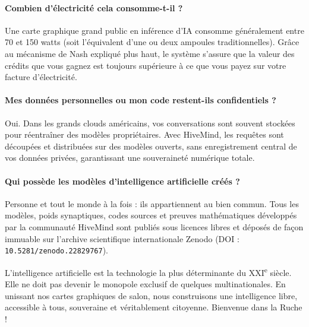 \documentclass[11pt,a4paper]{article}
\begin{document}
\paragraph{Combien d'électricité cela consomme-t-il ?}
Une carte graphique grand public en inférence d'IA consomme généralement entre 70 et 150 watts (soit l'équivalent d'une ou deux ampoules traditionnelles). Grâce au mécanisme de Nash expliqué plus haut, le système s'assure que la valeur des crédits que vous gagnez est toujours supérieure à ce que vous payez sur votre facture d'électricité.

\paragraph{Mes données personnelles ou mon code restent-ils confidentiels ?}
Oui. Dans les grands clouds américains, vos conversations sont souvent stockées pour réentraîner des modèles propriétaires. Avec HiveMind, les requêtes sont découpées et distribuées sur des modèles ouverts, sans enregistrement central de vos données privées, garantissant une souveraineté numérique totale.

\paragraph{Qui possède les modèles d'intelligence artificielle créés ?}
Personne et tout le monde à la fois : ils appartiennent au bien commun. Tous les modèles, poids synaptiques, codes sources et preuves mathématiques développés par la communauté HiveMind sont publiés sous licences libres et déposés de façon immuable sur l'archive scientifique internationale Zenodo (DOI : \texttt{10.5281/zenodo.22829767}).

\vspace{1.0cm}
\begin{tcolorbox}[colback=hiveEmerald!8, colframe=hiveEmerald, title=\textbf{Conclusion : Reprenons le Contrôle de l'Intelligence Artificielle}]
L'intelligence artificielle est la technologie la plus déterminante du XXI\textsuperscript{e} siècle. Elle ne doit pas devenir le monopole exclusif de quelques multinationales. En unissant nos cartes graphiques de salon, nous construisons une intelligence libre, accessible à tous, souveraine et véritablement citoyenne. Bienvenue dans la Ruche !
\end{tcolorbox}
\end{document}
